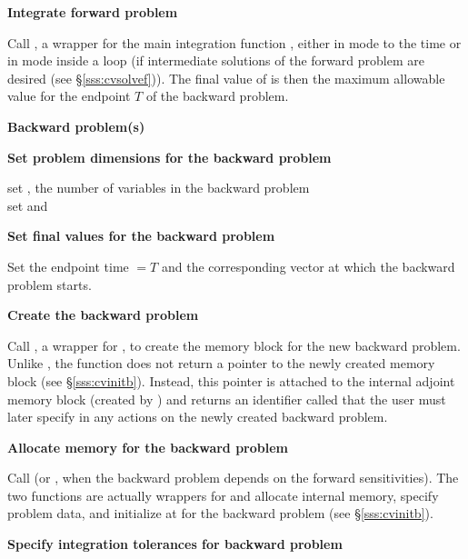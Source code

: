 \begin{Steps}
\item
  {\bf Integrate forward problem}

  Call , a wrapper for the {\cvodes} main integration
  function , either in  mode to the time 
   or in  mode inside a loop (if intermediate
  solutions of the forward problem are desired (see \S\ref{sss:cvsolvef})).
  The final value of  is then the maximum allowable value for the
  endpoint $T$ of the backward problem.

  \vspace{0.2in}\centerline{\bf Backward problem(s)}

 \item \label{i:back_start}
   {\bf Set problem dimensions for the backward problem}
   
   {\s} set , the number of variables in the backward problem \\
   {\p} set  and 

\item
  {\bf Set final values for the backward problem}

  Set the endpoint time  $= T$ and the corresponding vector 
  at which the backward problem starts.

\item
  {\bf Create the backward problem}

  Call , a wrapper for , to
  create the {\cvodes} memory block for the new backward problem. Unlike
  , the function  does not return a pointer to
  the newly created memory block (see \S\ref{sss:cvinitb}). Instead, this pointer
  is attached to the internal adjoint memory  block (created by )
  and returns an identifier called  that the user must later specify
  in any actions on the newly created backward problem.

\item
  {\bf Allocate memory for the backward problem}

  Call  (or , when the backward problem depends on the
  forward sensitivities). The two functions are actually wrappers for  
  and allocate internal memory, specify problem data, and initialize {\cvodes} 
  at  for the backward problem (see \S\ref{sss:cvinitb}).

\item 
  {\bf Specify integration tolerances for backward problem}
  

\end{Steps}
